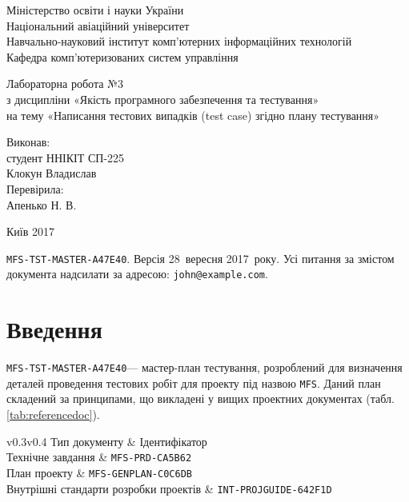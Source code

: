 \documentclass[a4paper,oneside,DIV=12,12pt]{scrartcl}
\newcommand\testplanid{\texttt{MFS-TST-MASTER-A47E40}}
\newcommand\projname{\texttt{MFS}}
\begin{document}
	\begin{titlepage}
    \begin{center}
	Міністерство освіти і науки України\\
	Національний авіаційний університет\\
	Навчально-науковий інститут комп'ютерних інформаційних технологій\\
	Кафедра комп'ютеризованих систем управління

	\vspace{\fill}

	Лабораторна робота №3\\
	з дисципліни «Якість програмного забезпечення та тестування»\\
	на тему «Написання тестових випадків (test case) згідно плану тестування»

	\vspace{\fill}
	
	\begin{flushright}
				Виконав:\\
				студент ННІКІТ СП-225\\
				Клокун Владислав\\
				Перевірила:\\
				Апенько Н. В.
	\end{flushright}

	Київ 2017

    \end{center}
    \end{titlepage}
	
	\noindent\testplanid. Версія 28~вересня 2017~року. Усі питання за змістом документа надсилати за адресою: \texttt{john@example.com}.
	
    \section{Введення}
		\testplanid --- мастер-план тестування, розроблений для визначення деталей проведення тестових робіт для проекту під назвою \projname. Даний план складений за принципами, що викладені у вищих проектних документах (табл. \ref{tab:referencedoc}).
	
		\begin{table}[h]
			\label{tab:referencedoc}
			\centering
			\begin{tabular}{v{0.3\textwidth}v{0.4\textwidth}}
				\toprule
				Тип документу & Ідентифікатор \\
				\midrule
				Технічне завдання & \texttt{MFS-PRD-CA5B62}\\
				План проекту & \texttt{MFS-GENPLAN-C0C6DB}\\
				Внутрішні стандарти розробки проектів & \texttt{INT-PROJGUIDE-642F1D}\\
				\bottomrule
			\end{tabular}
			\caption{Документи, на які спирається \testplanid}
		\end{table}
		
\end{document}
